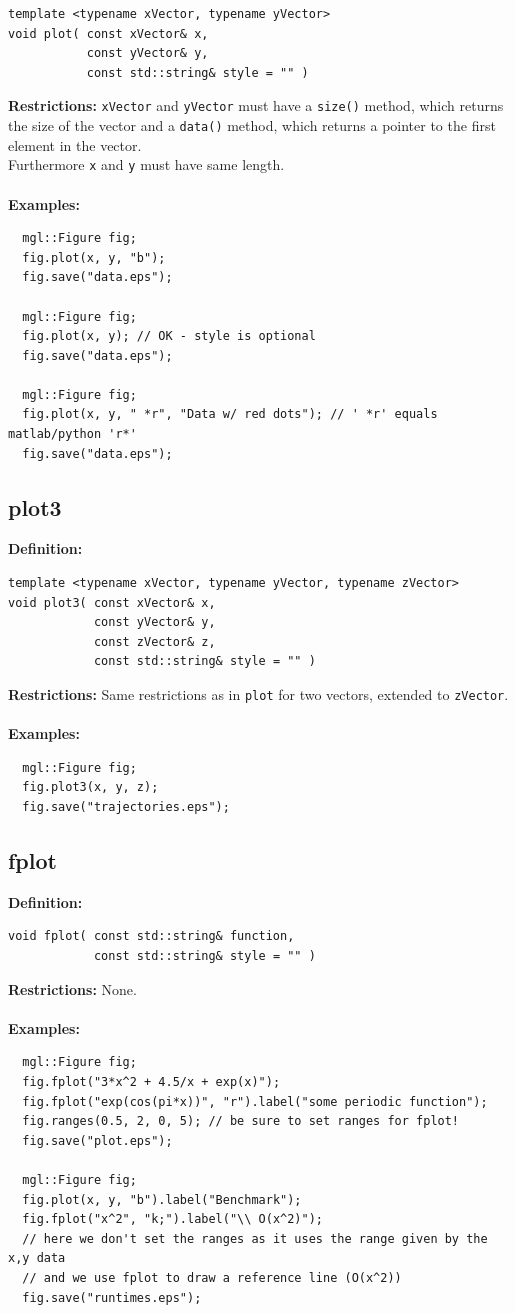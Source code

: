 \documentclass[a4paper]{article}
\newcommand{\command}[1]{\subsection{#1}}
\begin{document}
\begin{lstlisting}
template <typename xVector, typename yVector>
void plot( const xVector& x, 
           const yVector& y, 
           const std::string& style = "" )
\end{lstlisting}
\textbf{Restrictions:} \texttt{xVector} and \texttt{yVector} must have a \texttt{size()} method, which returns the size of the vector 
and a \texttt{data()} method, which returns a pointer to the first element in the vector. \\
Furthermore \texttt{x} and \texttt{y} must have same length. \\ \\
%
\textbf{Examples:}
\begin{lstlisting}
  mgl::Figure fig;
  fig.plot(x, y, "b");
  fig.save("data.eps");

  mgl::Figure fig;
  fig.plot(x, y); // OK - style is optional
  fig.save("data.eps");

  mgl::Figure fig;
  fig.plot(x, y, " *r", "Data w/ red dots"); // ' *r' equals matlab/python 'r*'
  fig.save("data.eps");
\end{lstlisting}

\command{plot3}

\textbf{Definition:}
\begin{lstlisting}
template <typename xVector, typename yVector, typename zVector>
void plot3( const xVector& x,
            const yVector& y,
            const zVector& z,
            const std::string& style = "" )
\end{lstlisting}
\textbf{Restrictions:} Same restrictions as in \texttt{plot} for two vectors, extended to \texttt{zVector}. \\ \\
%
\textbf{Examples:}
\begin{lstlisting}
  mgl::Figure fig;
  fig.plot3(x, y, z);
  fig.save("trajectories.eps");
\end{lstlisting}


\command{fplot}

\textbf{Definition:}
\begin{lstlisting}
void fplot( const std::string& function,
            const std::string& style = "" )
\end{lstlisting}
\textbf{Restrictions:} None. \\ \\
%
\textbf{Examples:}
\begin{lstlisting}
  mgl::Figure fig;
  fig.fplot("3*x^2 + 4.5/x + exp(x)");
  fig.fplot("exp(cos(pi*x))", "r").label("some periodic function");
  fig.ranges(0.5, 2, 0, 5); // be sure to set ranges for fplot!
  fig.save("plot.eps");

  mgl::Figure fig;
  fig.plot(x, y, "b").label("Benchmark");
  fig.fplot("x^2", "k;").label("\\ O(x^2)");
  // here we don't set the ranges as it uses the range given by the x,y data
  // and we use fplot to draw a reference line (O(x^2))
  fig.save("runtimes.eps"); 
\end{lstlisting}
\end{document}
